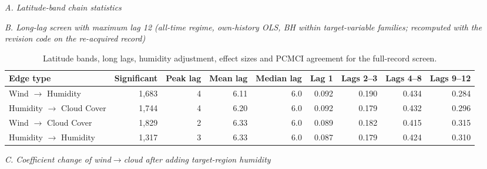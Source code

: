 \documentclass[11pt]{article}
\begin{document}
\begin{table}[htbp]
\centering
\caption{Latitude bands, long lags, humidity adjustment, effect sizes and PCMCI agreement for the full-record screen.}
\label{tab:s10}
\scriptsize
\par\smallskip\noindent\textit{A. Latitude-band chain statistics}\par\smallskip
{}
\par\smallskip\noindent\textit{B. Long-lag screen with maximum lag 12 (all-time regime, own-history OLS, BH within target-variable families; recomputed with the revision code on the re-acquired record)}\par\smallskip
\begin{tabular}{@{}lrrrrrrrr@{}}
\toprule
Edge type & Significant & Peak lag & Mean lag & Median lag & Lag 1 & Lags 2--3 & Lags 4--8 & Lags 9--12 \\
\midrule
Wind $\rightarrow$ Humidity & 1,683 & 4 & 6.11 & 6.0 & 0.092 & 0.190 & 0.434 & 0.284 \\
Humidity $\rightarrow$ Cloud Cover & 1,744 & 4 & 6.20 & 6.0 & 0.092 & 0.179 & 0.432 & 0.296 \\
Wind $\rightarrow$ Cloud Cover & 1,829 & 2 & 6.33 & 6.0 & 0.089 & 0.182 & 0.415 & 0.315 \\
Humidity $\rightarrow$ Humidity & 1,317 & 3 & 6.33 & 6.0 & 0.087 & 0.179 & 0.424 & 0.310 \\
\bottomrule
\end{tabular}
\par\smallskip\noindent\textit{C. Coefficient change of wind$\rightarrow$cloud after adding target-region humidity}\par\smallskip
{}
\end{table}
\end{document}
